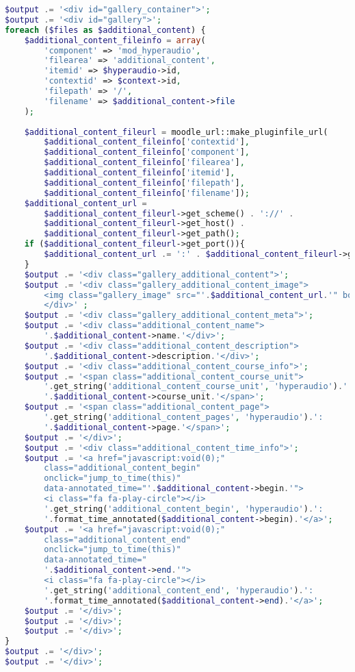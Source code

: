 \begin{lstlisting}[language=php,
             linewidth=\textwidth,
             caption={Ausschnitt der \textbf{renderer.php} in der 8. Iteration},
             label={lst:it8:renderer}]
$output .= '<div id="gallery_container">';
$output .= '<div id="gallery">';
foreach ($files as $additional_content) {
    $additional_content_fileinfo = array(
        'component' => 'mod_hyperaudio',
        'filearea' => 'additional_content',
        'itemid' => $hyperaudio->id,
        'contextid' => $context->id,
        'filepath' => '/',
        'filename' => $additional_content->file
    );
            
    $additional_content_fileurl = moodle_url::make_pluginfile_url(
        $additional_content_fileinfo['contextid'],
        $additional_content_fileinfo['component'],
        $additional_content_fileinfo['filearea'],
        $additional_content_fileinfo['itemid'],
        $additional_content_fileinfo['filepath'],
        $additional_content_fileinfo['filename']);
    $additional_content_url =
        $additional_content_fileurl->get_scheme() . '://' . 
        $additional_content_fileurl->get_host() . 
        $additional_content_fileurl->get_path();
    if ($additional_content_fileurl->get_port()){
        $additional_content_url .= ':' . $additional_content_fileurl->get_port();
    }
    $output .= '<div class="gallery_additional_content">';
    $output .= '<div class="gallery_additional_content_image">
        <img class="gallery_image" src="'.$additional_content_url.'" border="5">
        </div>' ;
    $output .= '<div class="gallery_additional_content_meta">';
    $output .= '<div class="additional_content_name">
        '.$additional_content->name.'</div>';
    $output .= '<div class="additional_content_description">
        '.$additional_content->description.'</div>';
    $output .= '<div class="additional_content_course_info">';
    $output .= '<span class="additional_content_course_unit">
        '.get_string('additional_content_course_unit', 'hyperaudio').': 
        '.$additional_content->course_unit.'</span>';
    $output .= '<span class="additional_content_page">
        '.get_string('additional_content_pages', 'hyperaudio').': 
        '.$additional_content->page.'</span>';
    $output .= '</div>';
    $output .= '<div class="additional_content_time_info">';
    $output .= '<a href="javascript:void(0);" 
        class="additional_content_begin"
        onclick="jump_to_time(this)"
        data-annotated_time="'.$additional_content->begin.'">
        <i class="fa fa-play-circle"></i>
        '.get_string('additional_content_begin', 'hyperaudio').':
        '.format_time_annotated($additional_content->begin).'</a>';
    $output .= '<a href="javascript:void(0);" 
        class="additional_content_end"
        onclick="jump_to_time(this)"
        data-annotated_time="
        '.$additional_content->end.'">
        <i class="fa fa-play-circle"></i>
        '.get_string('additional_content_end', 'hyperaudio').':
        '.format_time_annotated($additional_content->end).'</a>';
    $output .= '</div>';
    $output .= '</div>';
    $output .= '</div>';
}
$output .= '</div>';
$output .= '</div>';
\end{lstlisting}

